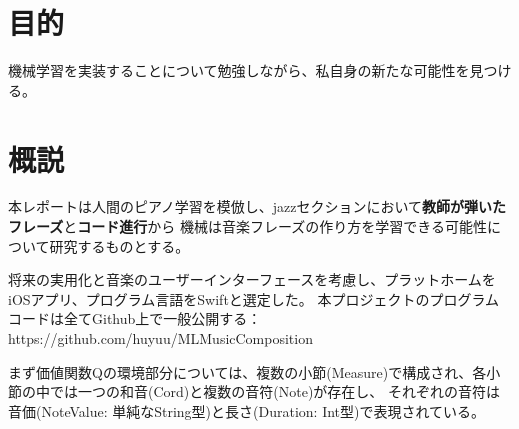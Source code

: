 \documentclass[10.5pt]{jsarticle}
\begin{document}
\section{目的}
機械学習を実装することについて勉強しながら、私自身の新たな可能性を見つける。

\section{概説}
本レポートは人間のピアノ学習を模倣し、jazzセクションにおいて{\bf 教師が弾いたフレーズ}と{\bf コード進行}から
機械は音楽フレーズの作り方を学習できる可能性について研究するものとする。

将来の実用化と音楽のユーザーインターフェースを考慮し、プラットホームをiOSアプリ、プログラム言語をSwiftと選定した。
本プロジェクトのプログラムコードは全てGithub上で一般公開する：https://github.com/huyuu/MLMusicComposition

まず価値関数Qの環境部分については、複数の小節(Measure)で構成され、各小節の中では一つの和音(Cord)と複数の音符(Note)が存在し、
それぞれの音符は音価(NoteValue: 単純なString型)と長さ(Duration: Int型)で表現されている。


\section{}
\end{document}
